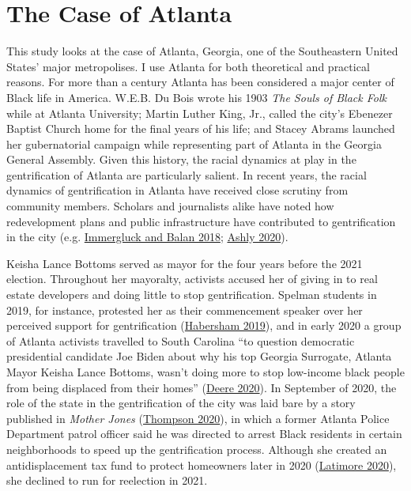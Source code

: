 \documentclass[
  12pt,
]{article}
\begin{document}
\hypertarget{the-case-of-atlanta}{%
\section{The Case of Atlanta}\label{the-case-of-atlanta}}

This study looks at the case of Atlanta, Georgia, one of the Southeastern United States' major metropolises. I use Atlanta for both theoretical and practical reasons. For more than a century Atlanta has been considered a major center of Black life in America. W.E.B. Du Bois wrote his 1903 \emph{The Souls of Black Folk} while at Atlanta University; Martin Luther King, Jr., called the city's Ebenezer Baptist Church home for the final years of his life; and Stacey Abrams launched her gubernatorial campaign while representing part of Atlanta in the Georgia General Assembly. Given this history, the racial dynamics at play in the gentrification of Atlanta are particularly salient. In recent years, the racial dynamics of gentrification in Atlanta have received close scrutiny from community members. Scholars and journalists alike have noted how redevelopment plans and public infrastructure have contributed to gentrification in the city (e.g. \protect\hyperlink{ref-Immergluck2018}{Immergluck and Balan 2018}; \protect\hyperlink{ref-Ashly2020}{Ashly 2020}).

Keisha Lance Bottoms served as mayor for the four years before the 2021 election. Throughout her mayoralty, activists accused her of giving in to real estate developers and doing little to stop gentrification. Spelman students in 2019, for instance, protested her as their commencement speaker over her perceived support for gentrification (\protect\hyperlink{ref-Habersham2019}{Habersham 2019}), and in early 2020 a group of Atlanta activists travelled to South Carolina ``to question democratic presidential candidate Joe Biden about why his top Georgia Surrogate, Atlanta Mayor Keisha Lance Bottoms, wasn't doing more to stop low-income black people from being displaced from their homes'' (\protect\hyperlink{ref-Deere2020}{Deere 2020}). In September of 2020, the role of the state in the gentrification of the city was laid bare by a story published in \emph{Mother Jones} (\protect\hyperlink{ref-Thompson2020}{Thompson 2020}), in which a former Atlanta Police Department patrol officer said he was directed to arrest Black residents in certain neighborhoods to speed up the gentrification process. Although she created an antidisplacement tax fund to protect homeowners later in 2020 (\protect\hyperlink{ref-Latimore2020}{Latimore 2020}), she declined to run for reelection in 2021.
\end{document}

